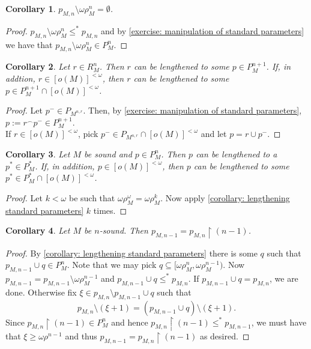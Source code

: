 \documentclass[12pt,a4paper]{article}
\theoremstyle{nicestyle}
\newtheorem{corollary}{Corollary}[subsection]
\begin{document}
  \begin{corollary}
    $p_{M,n} \setminus \omega\rho^{n}_{M} = \emptyset$.
  \end{corollary}

  \begin{proof}
    $p_{M,n} \setminus \omega\rho^{n}_{M} \le^{*} p_{M,n}$ and by
    \autoref{exercise: manipulation of standard parameters} we have
    that $p_{M,n} \setminus \omega\rho^{n}_{M} \in P^{n}_{M}$.
  \end{proof}

  \begin{corollary} \label{corollary: lengthening standard parameters}
    Let $r \in R^{n}_{M}$. Then $r$ can be lengthened to some
    $p \in P^{n+1}_{M}$. If, in addtion, $r \in [o(M)]^{< \omega}$,
    then $r$ can be lengthened to some
    $p \in P^{n+1}_{M} \cap [o(M)]^{<\omega}$.
  \end{corollary}

  \begin{proof}
    Let $p^{-} \in P_{M^{n, r}}$. Then, by \autoref{exercise:
      manipulation of standard parameters},
    $p := r ^{\frown} p^{-} \in P^{n+1}_{M}$. \\
    If $r \in [o(M)]^{< \omega}$, pick
    $p^{-} \in P_{M^{n, r}} \cap [o(M)]^{< \omega}$ and let
    $p = r \cup p^{-}$.
  \end{proof}

  \begin{corollary}
    Let $M$ be sound and $p \in P^{n}_{M}$. Then $p$ can be lengthened
    to a $p^{*} \in P^{*}_{M}$. If, in addition,
    $p \in [o(M)]^{<\omega}$, then $p$ can be lengthened to some
    $p^{*} \in P^{*}_{M} \cap [o(M)]^{<\omega}$.
  \end{corollary}

  \begin{proof}
    Let $k < \omega$ be such that
    $\omega\rho_{M}^{\omega} = \omega \rho_{M}^{k}$. Now apply
    \autoref{corollary: lengthening standard parameters} $k$
    times.
  \end{proof}

  \begin{corollary}
    Let $M$ be $n$-sound. Then
    $p_{M, n-1} = p_{M,n} \restriction (n-1)$.
  \end{corollary}

  \begin{proof}
    By \autoref{corollary: lengthening standard parameters} there is
    some $q$ such that $p_{M, n-1} \cup q \in P^{n}_{M}$. Note that we
    may pick $q \subseteq [\omega\rho^{n}_{M},
    \omega\rho^{n-1}_{M})$. Now
    $p_{M, n-1} = p_{M, n-1} \setminus \omega\rho^{n-1}_{M}$ and
    $p_{M, n-1} \cup q \le^{*} p_{M,n}$. If
    $p_{M, n-1} \cup q = p_{M,n}$, we are done. Otherwise fix
    $\xi \in p_{M,n} \setminus p_{M, n-1} \cup q$ such that
    \[
      p_{M,n} \setminus (\xi + 1) = (p_{M, n-1} \cup q) \setminus (\xi
      + 1).
    \]
    Since $p_{M,n} \restriction (n-1) \in P^{n}_{M}$ and hence
    $p_{M,n} \restriction (n-1) \le^{*} p_{M, n-1}$, we must have that
    $\xi \ge \omega\rho^{n-1}$ and thus
    $p_{M, n-1} = p_{M,n} \restriction (n-1)$ as desired.
  \end{proof}
  
\end{document}
